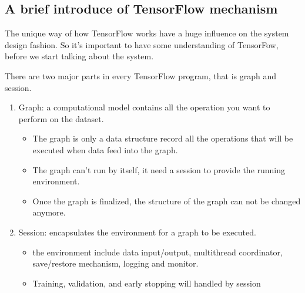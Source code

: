 \subsection{A brief introduce of TensorFlow mechanism}
The unique way of how TensorFlow works have a huge influence on the system design fashion. So it's important to have some understanding of TensorFow, before we start talking about the system. \par
There are two major parts in every TensorFlow program, that is graph and session.
\begin{enumerate}
   \item Graph: a computational model contains all the operation you want to perform on the dataset.
   \begin{itemize}
     \item The graph is only a data structure record all the operations that will be executed when data feed into the graph. 
     \item The graph can't run by itself, it need a session to provide the running environment.
     \item Once the graph is finalized, the structure of the graph can not be changed anymore.
   \end{itemize}
   \item Session: encapsulates the environment for a graph to be executed.
   \begin{itemize}
       \item the environment include data input/output, multithread coordinator, save/restore mechanism, logging and monitor. 
       \item Training, validation, and early stopping will handled by session
   \end{itemize}
\end{enumerate}


